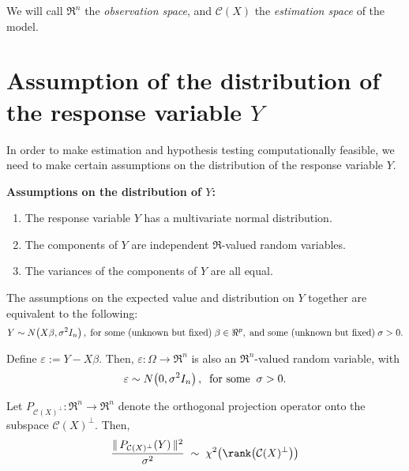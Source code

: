 \documentclass{article}
\begin{document}
\vskip 0.25cm
\noindent
We will call $\Re^{n}$ the \emph{observation space}, and $\mathcal{C}(X)$ the \emph{estimation space} of the model.


\section{Assumption of the distribution of the response variable $Y$}
\setcounter{theorem}{0}\setcounter{equation}{0}

In order to make estimation and hypothesis testing computationally feasible, we need to make certain assumptions on the distribution of the response variable $Y$.

\begin{center}
\begin{minipage}{16cm}
\vskip 0.3cm
\noindent
\textbf{Assumptions on the distribution of $Y$:}
\begin{enumerate}
\item	The response variable $Y$ has a multivariate normal distribution.
\item	The components of $Y$ are independent $\Re$-valued random variables.
\item	The variances of the components of $Y$ are all equal.
\end{enumerate}
\end{minipage}
\end{center}

\vskip 0.3cm
\noindent
The assumptions on the expected value and distribution on $Y$ together are equivalent to the following:
\begin{equation}\label{ErrorNormalityIndependenceEqualVariance}
Y \sim N\!\left(X\beta,\sigma^{2}I_{n}\right),\;\textnormal{for some (unknown but fixed)}\;\beta\in\Re^{p},\;\textnormal{and some (unknown but fixed)}\;\sigma > 0.
\end{equation}

Define $\varepsilon := Y - X\beta$.  Then, $\varepsilon : \Omega \longrightarrow \Re^{n}$ is also an $\Re^{n}$-valued random variable, with
\begin{equation}\label{residualDistribution}
\varepsilon \sim N\!\left(0,\sigma^{2}I_{n}\right),\;\;\textnormal{for some}\;\;\sigma > 0.
\end{equation}

\begin{proposition} \mbox{}
\vskip 0.1cm
\noindent
Let $P_{\mathcal{C}(X)^{\perp}} : \Re^{n} \longrightarrow \Re^{n}$ denote the orthogonal projection operator onto the subspace $\mathcal{C}(X)^{\perp}$.  Then,
\begin{equation*}
\dfrac{\Vert\,P_{\mathcal{C}(X)^{\perp}}(Y)\,\Vert^{2}}{\sigma^{2}} \; \sim \; \chi^{2}\!\left(\rank\!\left(\mathcal{C}(X)^{\perp}\right)\right)
\end{equation*}
\end{proposition}
\end{document}
